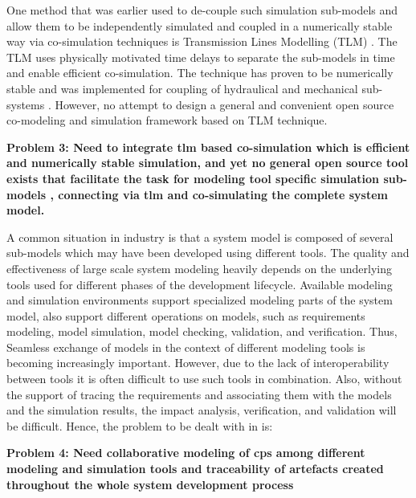 One method that was earlier used to de-couple such simulation sub-models and allow them to be independently simulated and coupled in a numerically stable way via co-simulation techniques is Transmission Lines Modelling (TLM) \cite{tlmkurs90,tlmkurs99,tlmcogan,tlmjohns}. The TLM uses physically motivated time delays to separate the sub-models in time and enable efficient co-simulation. The technique has proven to be numerically stable and was implemented for coupling of hydraulical and mechanical sub-systems \cite{tlmkurs90,tlmkurs99}. However, no attempt to design a general and convenient open source co-modeling and simulation framework based on TLM technique. 

\begin{description}

\item \textbf{Problem 3: Need to integrate \acrshort{tlm} based co-simulation which is  efficient and numerically stable simulation, and yet no general open source  tool exists that facilitate the task  for modeling tool specific simulation sub-models , connecting via \acrshort{tlm}  and co-simulating the complete system model.}

\end{description}

A common situation in industry is that a system model is composed of several sub-models which may have been developed using different tools. The quality and effectiveness of large scale system modeling heavily depends on the underlying tools used for different phases of the development lifecycle. Available modeling and simulation environments support specialized modeling parts of the system model, also support different operations on models, such as requirements modeling, model simulation, model checking, validation, and verification. Thus, Seamless exchange of models in the context of different modeling tools is becoming increasingly important. However, due to the lack of interoperability between tools it is often difficult to use such tools in combination. Also, without the support of tracing the requirements and associating them with the models and the simulation results, the impact analysis, verification, and validation will be difficult. Hence, the problem to be dealt with in is:

\begin{description}

\item \textbf{Problem 4: Need collaborative modeling of \acrshort{cps} among different modeling and simulation tools and traceability of artefacts created throughout the whole system development process}

\end{description}

